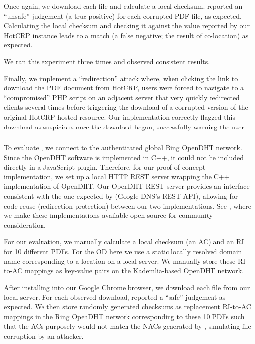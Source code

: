 Once again, we download each file and calculate a local checksum. \DNSSYS{}
reported an ``unsafe'' judgement (a true positive) for each corrupted PDF file,
as expected. Calculating the local checksum and checking it against the value
reported by our HotCRP instance leads to a match (a false negative; \ie the
result of co-location) as expected.

We ran this experiment three times and observed consistent results.

Finally, we implement a ``redirection'' attack where, when clicking the link
to download the PDF document from HotCRP, users were forced to navigate to a
``compromised'' PHP script on an adjacent server that very quickly redirected
clients several times before triggering the download of a corrupted version of
the original HotCRP-hosted resource. Our implementation correctly flagged this
download as suspicious once the download began, successfully warning the user.

\subsubsection{\DHTSYS{}}

To evaluate \DHTSYS{}, we connect to the authenticated global Ring OpenDHT
network. Since the OpenDHT software is implemented in C++, it could not be
included directly in a JavaScript plugin. Therefore, for our proof-of-concept
implementation, we set up a local HTTP REST server wrapping the C++
implementation of OpenDHT. Our OpenDHT REST server provides an interface
consistent with the one expected by \DNSSYS{} (\ie Google DNS's REST API),
allowing for code reuse (\eg redirection protection) between our two
implementations. See , where we make these implementations
available open source for community consideration.

For our evaluation, we manually calculate a local checksum (\ie an AC) and an
RI for 10 different \CONFERENCE{} PDFs. For the OD here we use a static locally
resolved domain name corresponding to a location on a local server. We manually
store these RI-to-AC mappings as key-value pairs on the Kademlia-based OpenDHT
network.

After installing \DHTSYS{} into our Google Chrome browser, we download each
file from our local server. For each observed download, \DHTSYS{} reported a
``safe'' judgement as expected. We then store randomly generated checksums as
replacement RI-to-AC mappings in the Ring OpenDHT network corresponding to these
10 PDFs such that the ACs purposely would not match the NACs generated by
\DHTSYS{}, simulating file corruption by an attacker.

